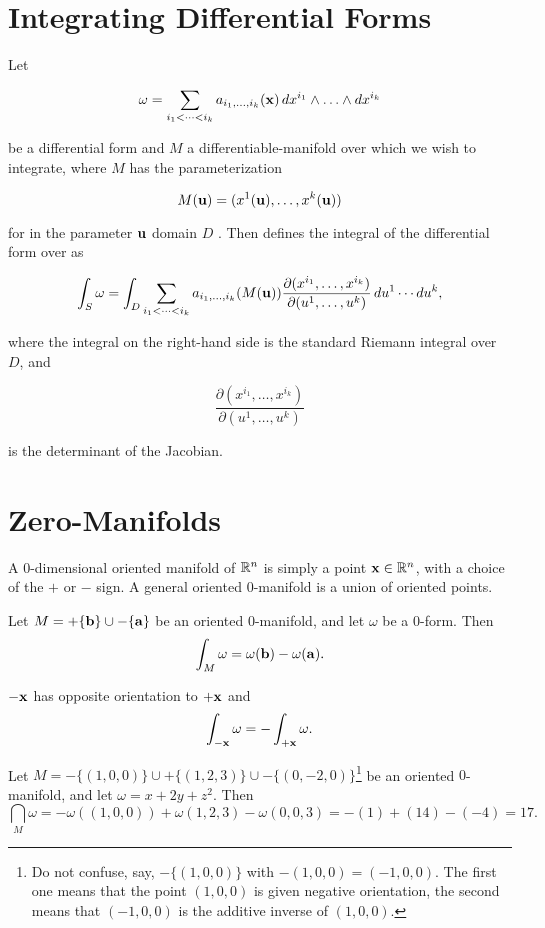 \section{Integrating Differential Forms}
Let

\[\omega=\displaystyle\sum_{i_1 < \cdots < i_k} a_{i_1,\dots,i_k}({\mathbf{ x}})\,dx^{i_1} \wedge \ldots \wedge dx^{i_k}\]

be a differential form and $M$ a differentiable-manifold over 
which we
wish to integrate, where $M$ has the parameterization

\[M({\mathbf{ u}})=(x^1({\mathbf{ u}}),\dots,x^k({\mathbf{ u}}))\]

for in the parameter $\mathbf{ u}$ domain $D$ . Then defines the integral of the
differential form over as

\[\int_S \omega =\int_D \displaystyle\sum_{i_1 < \cdots < i_k} a_{i_1,\dots,i_k}(M({\mathbf{ u}})) \frac{\partial(x^{i_1},\dots,x^{i_k})}{\partial(u^{1},\dots,u^{k})}\,du^1 \cdots du^k,\]

where the integral on the right-hand side is the standard Riemann  integral over $D$, and

\[\frac{\partial(x^{i_1},\dots,x^{i_k})}{\partial(u^{1},\dots,u^{k})}\]

is the determinant of the Jacobian.



\section{Zero-Manifolds }
\begin{df}
A  {$0$-dimensional  oriented manifold of $\mathbb{R}^n$} is simply
a point ${\mathbf x}\in \mathbb{R}^n$, with a choice of the  $+$ or $-$
sign. A general oriented $0$-manifold is a union of oriented points.
\end{df}
\begin{df}
Let $M = +\{{\mathbf b}\} \cup -\{{\mathbf a}\}$ be an oriented
$0$-manifold, and let $\omega$ be a $0$-form. Then
$$ \displaystyle\int _M \omega = \omega ({\mathbf b}) - \omega ({\mathbf a}).   $$
\end{df}

\begin{rem}$-{\mathbf x}$ has opposite orientation to $+{\mathbf x}$ and
$$ \displaystyle\int _{-{\mathbf x}} \omega = -\displaystyle\int _{+{\mathbf x}} \omega .   $$
\end{rem}
\begin{exa}
Let $M = -\{(1,0,0)\} \cup +\{(1,2,3)\} \cup
-\{(0,-2,0)\}$\footnote{Do not confuse, say, $-\{(1,0,0)\}$ with
$-(1,0,0) = (-1,0,0)$. The first one means that the point
$(1,0,0)$ is given negative orientation, the second means that
$(-1,0,0)$ is the additive inverse of $(1,0,0)$. } be an oriented
$0$-manifold, and let $\omega = x + 2y + z^2$. Then
$$\dint _M\omega = -\omega ((1,0,0)) + \omega (1,2,3) - \omega (0,0,3) = -(1) + (14) - (-4) = 17.         $$
\end{exa}

